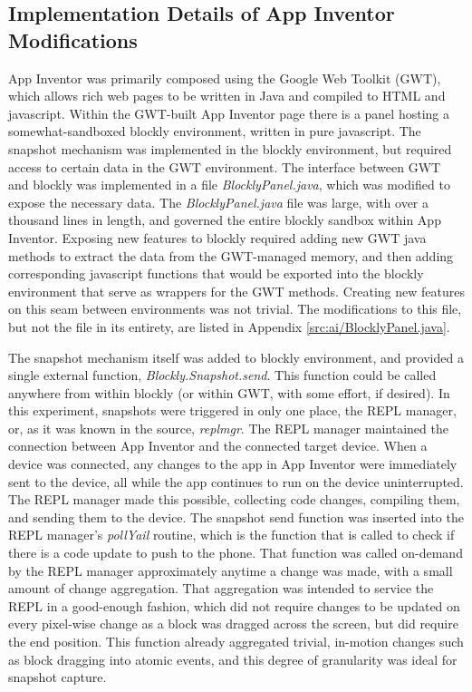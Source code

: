 \subsection{Implementation Details of App Inventor Modifications}
\label{sub:tech:ai}
App Inventor was primarily composed using the Google Web Toolkit (GWT), which allows rich web pages to be written in Java and compiled to HTML and javascript. Within the GWT-built App Inventor page there is a panel hosting a somewhat-sandboxed blockly environment, written in pure javascript. The snapshot mechanism was implemented in the blockly environment, but required access to certain data in the GWT environment. The interface between GWT and blockly was implemented in a file \emph{BlocklyPanel.java}, which was modified to expose the necessary data. The \emph{BlocklyPanel.java} file was large, with over a thousand lines in length, and governed the entire blockly sandbox within App Inventor. Exposing new features to blockly required adding new GWT java methods to extract the data from the GWT-managed memory, and then adding corresponding javascript functions that would be exported into the blockly environment that serve as wrappers for the GWT methods. Creating new features on this seam between environments was not trivial. The modifications to this file, but not the file in its entirety, are listed in Appendix \ref{src:ai/BlocklyPanel.java}.

The snapshot mechanism itself was added to blockly environment, and provided a single external function, \emph{Blockly.Snapshot.send}. This function could be called anywhere from within blockly (or within GWT, with some effort, if desired). In this experiment, snapshots were triggered in only one place, the REPL manager, or, as it was known in the source, \emph{replmgr}. The REPL manager maintained the connection between App Inventor and the connected target device. When a device was connected, any changes to the app in App Inventor were immediately sent to the device, all while the app continues to run on the device uninterrupted. The REPL manager made this possible, collecting code changes, compiling them, and sending them to the device. The snapshot send function was inserted into the REPL manager's \emph{pollYail} routine, which is the function that is called to check if there is a code update to push to the phone. That function was called on-demand by the REPL manager approximately anytime a change was made, with a small amount of change aggregation. That aggregation was intended to service the REPL in a good-enough fashion, which did not require changes to be updated on every pixel-wise change as a block was dragged across the screen, but did require the end position. This function already aggregated trivial, in-motion changes such as block dragging into atomic events, and this degree of granularity was ideal for snapshot capture. 

